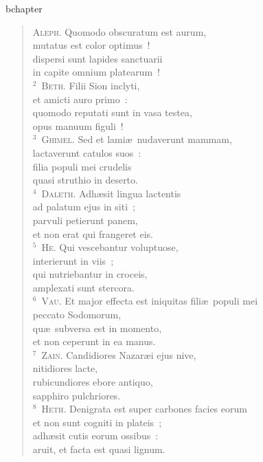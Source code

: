 bchapter\begin{flushleft}\begin{verse}\vspace{-19pt}\textsc{Aleph.} Quomodo obscuratum est aurum,\\ mutatus est color optimus~!\\ dispersi sunt lapides sanctuarii\\ in capite omnium platearum~!\\
${}^{2}$~\textsc{Beth.} Filii Sion inclyti,\\ et amicti auro primo~:\\ quomodo reputati sunt in vasa testea,\\ opus manuum figuli~!\\
${}^{3}$~\textsc{Ghimel.} Sed et lami\ae\ nudaverunt mammam,\\ lactaverunt catulos suos~:\\ filia populi mei crudelis\\ quasi struthio in deserto.\\
${}^{4}$~\textsc{Daleth.} Adh\ae sit lingua lactentis\\ ad palatum ejus in siti~;\\ parvuli petierunt panem,\\ et non erat qui frangeret eis.\\
${}^{5}$~\textsc{He.} Qui vescebantur voluptuose,\\ interierunt in viis~;\\ qui nutriebantur in croceis,\\ amplexati sunt stercora.\\
${}^{6}$~\textsc{Vau.} Et major effecta est iniquitas fili\ae\ populi mei\\ peccato Sodomorum,\\ qu\ae\ subversa est in momento,\\ et non ceperunt in ea manus.\\
${}^{7}$~\textsc{Zain.} Candidiores Nazar\ae i ejus nive,\\ nitidiores lacte,\\ rubicundiores ebore antiquo,\\ sapphiro pulchriores.\\
${}^{8}$~\textsc{Heth.} Denigrata est super carbones facies eorum\\ et non sunt cogniti in plateis~;\\ adh\ae sit cutis eorum ossibus~:\\ aruit, et facta est quasi lignum.\\

\end{verse}
\end{flushleft}
